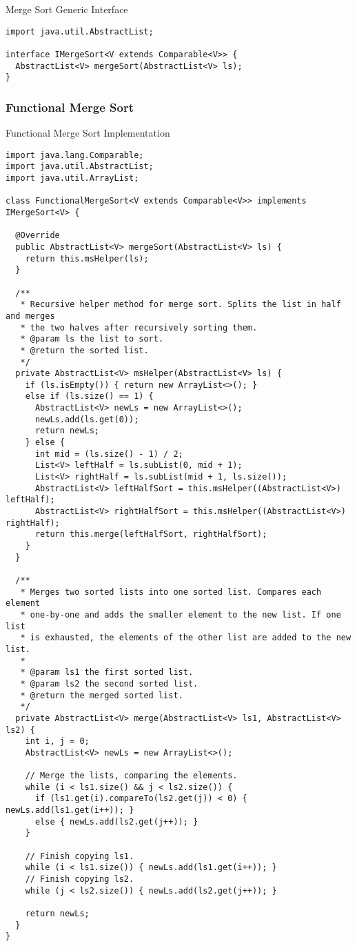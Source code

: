 \begin{cl}[]{Merge Sort Generic Interface}
\begin{lstlisting}[language=MyJava]
import java.util.AbstractList;

interface IMergeSort<V extends Comparable<V>> {
  AbstractList<V> mergeSort(AbstractList<V> ls);
}
\end{lstlisting}
\end{cl}

\subsubsection*{Functional Merge Sort}
\begin{cl}[]{Functional Merge Sort Implementation}
\begin{lstlisting}[language=MyJava]
import java.lang.Comparable;
import java.util.AbstractList;
import java.util.ArrayList;
  
class FunctionalMergeSort<V extends Comparable<V>> implements IMergeSort<V> {
  
  @Override
  public AbstractList<V> mergeSort(AbstractList<V> ls) {
    return this.msHelper(ls);
  }
  
  /**
   * Recursive helper method for merge sort. Splits the list in half and merges
   * the two halves after recursively sorting them.
   * @param ls the list to sort.
   * @return the sorted list.
   */
  private AbstractList<V> msHelper(AbstractList<V> ls) {
    if (ls.isEmpty()) { return new ArrayList<>(); }
    else if (ls.size() == 1) {
      AbstractList<V> newLs = new ArrayList<>();
      newLs.add(ls.get(0));
      return newLs;
    } else {
      int mid = (ls.size() - 1) / 2;
      List<V> leftHalf = ls.subList(0, mid + 1);
      List<V> rightHalf = ls.subList(mid + 1, ls.size());
      AbstractList<V> leftHalfSort = this.msHelper((AbstractList<V>) leftHalf);
      AbstractList<V> rightHalfSort = this.msHelper((AbstractList<V>) rightHalf);
      return this.merge(leftHalfSort, rightHalfSort);
    }
  }
  
  /**
   * Merges two sorted lists into one sorted list. Compares each element 
   * one-by-one and adds the smaller element to the new list. If one list 
   * is exhausted, the elements of the other list are added to the new list.
   *
   * @param ls1 the first sorted list.
   * @param ls2 the second sorted list.
   * @return the merged sorted list.
   */
  private AbstractList<V> merge(AbstractList<V> ls1, AbstractList<V> ls2) {
    int i, j = 0;
    AbstractList<V> newLs = new ArrayList<>();
          
    // Merge the lists, comparing the elements.
    while (i < ls1.size() && j < ls2.size()) {
      if (ls1.get(i).compareTo(ls2.get(j)) < 0) { newLs.add(ls1.get(i++)); }
      else { newLs.add(ls2.get(j++)); }
    }
  
    // Finish copying ls1.
    while (i < ls1.size()) { newLs.add(ls1.get(i++)); }
    // Finish copying ls2.
    while (j < ls2.size()) { newLs.add(ls2.get(j++)); }

    return newLs;
  }
}
\end{lstlisting}
\end{cl}

